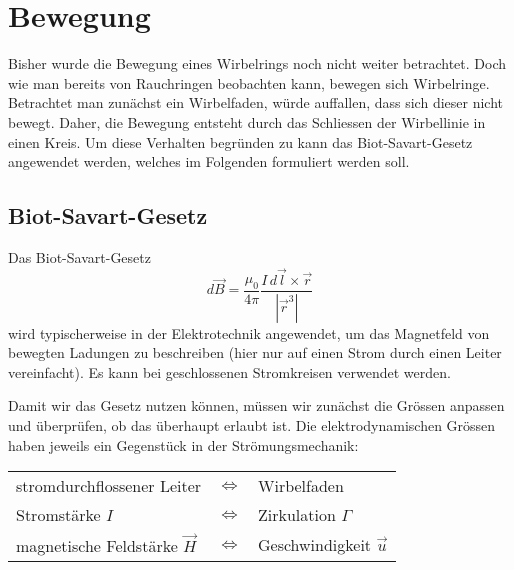 %
%
%
\section{Bewegung \label{paper:Wirbelringe:Bewegung}}

Bisher wurde die Bewegung eines Wirbelrings noch nicht weiter betrachtet. 
Doch wie man bereits von Rauchringen beobachten kann, bewegen sich Wirbelringe. 
Betrachtet man zunächst ein Wirbelfaden, würde auffallen, dass sich dieser nicht bewegt. 
Daher, die Bewegung entsteht durch das Schliessen der Wirbellinie in einen Kreis. 
Um diese Verhalten begründen zu kann das Biot-Savart-Gesetz \cite{Wirbelringe:FuehrerdurchdieStroemungslehre} angewendet werden, welches im Folgenden formuliert werden soll.

\subsection{Biot-Savart-Gesetz}

Das Biot-Savart-Gesetz
\[
d \vec{B}
=
\frac{\mu_0}{4\pi}\frac{I \,d \vec{l} \times \vec{r}}{\left\lvert \vec{r}^{3}\right\rvert }
\]  %
wird typischerweise in der Elektrotechnik angewendet, um das Magnetfeld von bewegten Ladungen zu beschreiben (hier nur auf einen Strom durch einen Leiter vereinfacht). 
Es kann bei geschlossenen Stromkreisen verwendet werden. 

Damit wir das Gesetz nutzen können, müssen wir zunächst die Grössen anpassen und überprüfen, ob das überhaupt erlaubt ist. 
Die elektrodynamischen Grössen haben jeweils ein Gegenstück in der Strömungsmechanik:

\begin{center}
    \begin{tabular}{lcl}
    stromdurchflossener Leiter          & \(\Leftrightarrow \) & Wirbelfaden \\
    Stromstärke \(I\)                   & \(\Leftrightarrow \) & Zirkulation \(\Gamma\) \\
    magnetische Feldstärke \(\vec{H}\)  & \(\Leftrightarrow \) & Geschwindigkeit \(\vec{u}\) \\
    \end{tabular}
\end{center}


